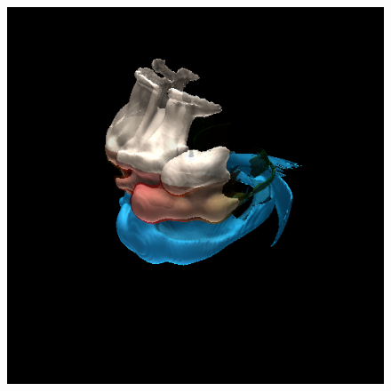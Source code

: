 \documentclass{egpubl}
\newlength{\boxheight}
\begin{document}
\begin{figure}[p]
  \centering
  \savebox{}
  \settoheight{\boxheight}{\usebox\savedProteinBox}
  \begin{minipage}[b][\boxheight][b]{0.24\linewidth}
    \centering%
    \begin{minipage}[t]{0.98\linewidth}
      \centering
      \includegraphics[width=\textwidth]{snapshots/space/space-only-isos}

\end{minipage}
\end{minipage}
\end{figure}
\end{document}
